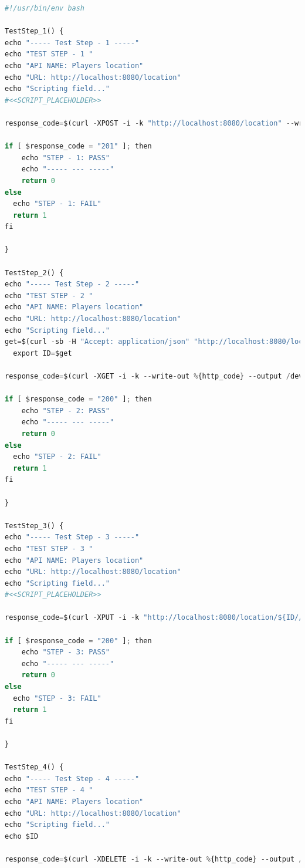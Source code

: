 \documentclass[a4paper,11pt]{book}
\begin{document}
\begin{lstlisting}[language=python,caption={  test\_location.sh }]
#!/usr/bin/env bash

TestStep_1() {
echo "----- Test Step - 1 -----"
echo "TEST STEP - 1 "
echo "API NAME: Players location"
echo "URL: http://localhost:8080/location"
echo "Scripting field..."
#<<SCRIPT_PLACEHOLDER>>

response_code=$(curl -XPOST -i -k "http://localhost:8080/location" --write-out %{http_code} --output /dev/null -d  '{"player":"suave93","x":67.33,"y":45.66,"z":5.55}' )

if [ $response_code = "201" ]; then
    echo "STEP - 1: PASS"
    echo "----- --- -----"
    return 0
else
  echo "STEP - 1: FAIL"
  return 1
fi

}

TestStep_2() {
echo "----- Test Step - 2 -----"
echo "TEST STEP - 2 "
echo "API NAME: Players location"
echo "URL: http://localhost:8080/location"
echo "Scripting field..."
get=$(curl -sb -H "Accept: application/json" "http://localhost:8080/location" | jq '.[0]._id')  
  export ID=$get

response_code=$(curl -XGET -i -k --write-out %{http_code} --output /dev/null http://localhost:8080/location)

if [ $response_code = "200" ]; then
    echo "STEP - 2: PASS"
    echo "----- --- -----"
    return 0
else
  echo "STEP - 2: FAIL"
  return 1
fi

}

TestStep_3() {
echo "----- Test Step - 3 -----"
echo "TEST STEP - 3 "
echo "API NAME: Players location"
echo "URL: http://localhost:8080/location"
echo "Scripting field..."
#<<SCRIPT_PLACEHOLDER>>

response_code=$(curl -XPUT -i -k "http://localhost:8080/location/${ID//\"}" --write-out %{http_code} --output /dev/null -d  '{"player":"suave93_Update","x":68.33,"y":46.66,"z":6.55}' )

if [ $response_code = "200" ]; then
    echo "STEP - 3: PASS"
    echo "----- --- -----"
    return 0
else
  echo "STEP - 3: FAIL"
  return 1
fi

}

TestStep_4() {
echo "----- Test Step - 4 -----"
echo "TEST STEP - 4 "
echo "API NAME: Players location"
echo "URL: http://localhost:8080/location"
echo "Scripting field..."
echo $ID

response_code=$(curl -XDELETE -i -k --write-out %{http_code} --output /dev/null http://localhost:8080/location/${ID//\"})


\end{lstlisting}
\end{document}
